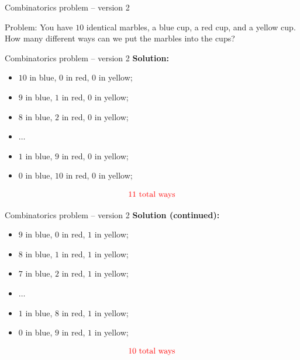 \documentclass{beamer}
\begin{document}
\begin{frame}{Combinatorics problem -- version 2}
\pause
  \begin{block}{Problem:}
\pause
    You have $10$ identical marbles, a blue cup, a red cup, and a yellow cup.\\
\pause
    How many different ways can we put the marbles into the cups?
  \end{block}
\end{frame}

\begin{frame}{Combinatorics problem -- version 2}
\pause
\textbf{Solution:}\\
  \begin{itemize}
\pause
    \item $10$ in blue, $0$ in red, $0$ in yellow;
\pause
    \item $9$ in blue, $1$ in red, $0$ in yellow;
\pause
    \item $8$ in blue, $2$ in red, $0$ in yellow;
\pause
    \item $\dots$
\pause
    \item $1$ in blue, $9$ in red, $0$ in yellow;
\pause
    \item $0$ in blue, $10$ in red, $0$ in yellow;
  \end{itemize}
\pause
$$\text{{\color{red}11 total ways}}$$
\end{frame}

\begin{frame}{Combinatorics problem -- version 2}
\textbf{Solution (continued):}\\
  \begin{itemize}
\pause
    \item $9$ in blue, $0$ in red, $1$ in yellow;
\pause
    \item $8$ in blue, $1$ in red, $1$ in yellow;
\pause
    \item $7$ in blue, $2$ in red, $1$ in yellow;
\pause
    \item $\dots$
\pause
    \item $1$ in blue, $8$ in red, $1$ in yellow;
\pause
    \item $0$ in blue, $9$ in red, $1$ in yellow;
  \end{itemize}
\pause
$$\text{{\color{red}10 total ways}}$$
\end{frame}
\end{document}
